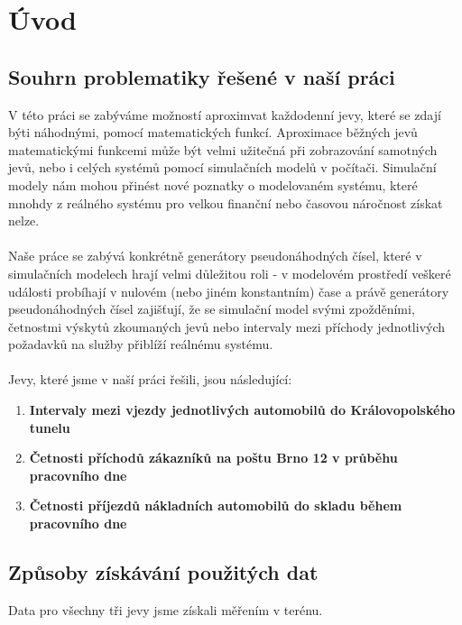 \documentclass[12pt,a4paper]{article}
\begin{document}

\clearpage

\tableofcontents
\clearpage

\section{Úvod}
	\subsection{Souhrn problematiky řešené v naší práci}
	V této práci se zabýváme možností aproximvat každodenní jevy, které se zdají býti náhodnými,
	pomocí matematických funkcí. Aproximace běžných jevů matematickými funkcemi může být velmi 
	užitečná při zobrazování samotných jevů, nebo i celých systémů pomocí simulačních modelů v
	počítači. Simulační modely nám mohou přinést nové poznatky o modelovaném systému, které 
	mnohdy z reálného systému pro velkou finanční nebo časovou náročnost získat nelze. \\ \\

	Naše práce se zabývá konkrétně generátory pseudonáhodných čísel, které v simulačních 
	modelech hrají velmi důležitou roli - v modelovém prostředí veškeré události probíhají v 
	nulovém (nebo jiném konstantním) čase a právě generátory pseudonáhodných čísel zajišťují,
	že se simulační model svými zpožděními, četnostmi výskytů zkoumaných jevů nebo intervaly mezi
	příchody jednotlivých požadavků na služby přiblíží reálnému systému. \\ \\

	Jevy, které jsme v naší práci řešili, jsou následující:
	\begin{enumerate}
		\item{\textbf{Intervaly mezi vjezdy jednotlivých automobilů do Královopolského tunelu}}
		\item{\textbf{Četnosti příchodů zákazníků na poštu Brno 12 v průběhu pracovního dne}}
		\item{\textbf{Četnosti příjezdů nákladních automobilů do skladu během pracovního dne}}
	\end{enumerate}

	\subsection{Způsoby získávání použitých dat}
	Data pro všechny tři jevy jsme získali měřením v terénu. \\ \\
\end{document}
